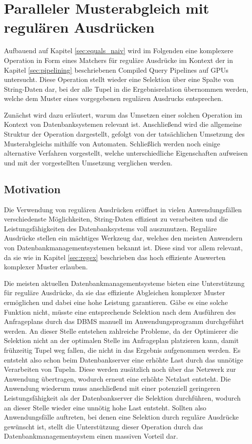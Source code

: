 \chapter{Paralleler Musterabgleich mit regulären Ausdrücken}
\label{sec:regex_naiv}

Aufbauend auf Kapitel \ref{sec:equals_naiv} wird im Folgenden eine komplexere Operation in Form eines Matchers für reguläre Ausdrücke im Kontext der in Kapitel \ref{sec:pipelining} beschriebenen Compiled Query Pipelines auf GPUs untersucht.
Diese Operation stellt wieder eine Selektion über eine Spalte von String-Daten dar, bei der alle Tupel in die Ergebnisrelation übernommen werden, welche dem Muster eines vorgegebenen regulären Ausdrucks entsprechen.

Zunächst wird dazu erläutert, warum das Umsetzen einer solchen Operation im Kontext von Datenbanksystemen relevant ist.
Anschließend wird die allgemeine Struktur der Operation dargestellt, gefolgt von der tatsächlichen Umsetzung des Musterabgleichs mithilfe von Automaten.
Schließlich werden noch einige alternative Verfahren vorgestellt, welche unterschiedliche Eigenschaften aufweisen und mit der vorgestellten Umsetzung verglichen werden.

\section{Motivation}

Die Verwendung von regulären Ausdrücken eröffnet in vielen Anwendungsfällen verschiedenste Möglichkeiten, String-Daten effizient zu verarbeiten und die Leistungsfähigkeiten des Datenbanksystems voll auszunutzen.
Reguläre Ausdrücke stellen ein mächtiges Werkzeug dar, welches den meisten Anwendern von Datenbankmanagementsystemen bekannt ist.
Diese sind vor allem relevant, da sie wie in Kapitel \ref{sec:regex} beschrieben das hoch effiziente Auswerten komplexer Muster erlauben.

Die meisten aktuellen Datenbankmanagementsysteme bieten eine Unterstützung für reguläre Ausdrücke, da sie das effiziente Abgleichen komplexer Muster ermöglichen und dabei eine hohe Leistung garantieren.
Gäbe es eine solche Funktion nicht, müsste eine entsprechende Selektion nach dem Ausführen des Anfrageplans durch das DBMS manuell im Anwendungsprogramm durchgeführt werden.
An dieser Stelle entstehen zahlreiche Probleme, da der Optimierer die Selektion nicht an der optimalen Stelle im Anfrageplan platzieren kann, damit frühzeitig Tupel weg fallen, die nicht in das Ergebnis aufgenommen werden.
Es entsteht also schon beim Datenbankserver eine erhöhte Last durch das unnötige Verarbeiten von Tupeln.
Diese werden zusätzlich noch über das Netzwerk zur Anwendung übertragen, wodurch erneut eine erhöhte Netzlast entsteht.
Die Anwendung wiederum muss anschließend mit einer potenziell geringeren Leistungsfähigkeit als der Datenbankserver die Selektion durchführen, wodurch an dieser Stelle wieder eine unnötig hohe Last entsteht.
Sollten also Anwendungsfälle auftreten, bei denen eine Selektion durch reguläre Ausdrücke gewünscht ist, stellt die Unterstützung dieser Operation durch das Datenbankmanagementsystem einen massiven Vorteil dar.

